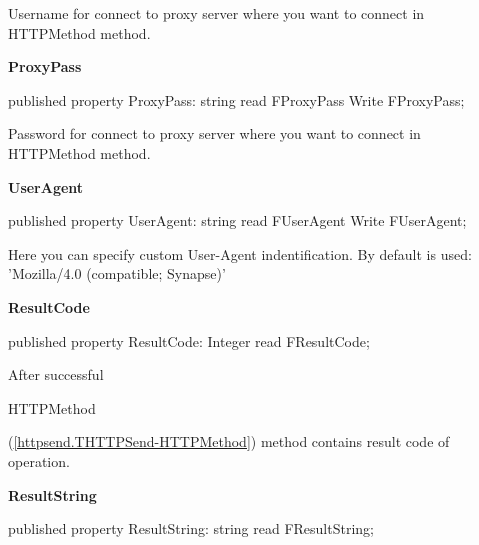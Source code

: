 \documentclass{report}
\newif\ifpdf
\begin{document}
\begin{list}{}
\begin{flushleft}
\ifpdf
\end{flushleft}
\fi


\par Username for connect to proxy server where you want to connect in HTTPMethod method.\label{httpsend.THTTPSend-ProxyPass}
\item[\textbf{ProxyPass}\hfill]
\ifpdf
\begin{flushleft}
\fi
\begin{ttfamily}
published property ProxyPass: string read FProxyPass Write FProxyPass;\end{ttfamily}

\ifpdf
\end{flushleft}
\fi


\par Password for connect to proxy server where you want to connect in HTTPMethod method.\label{httpsend.THTTPSend-UserAgent}
\item[\textbf{UserAgent}\hfill]
\ifpdf
\begin{flushleft}
\fi
\begin{ttfamily}
published property UserAgent: string read FUserAgent Write FUserAgent;\end{ttfamily}

\ifpdf
\end{flushleft}
\fi


\par Here you can specify custom User{-}Agent indentification. By default is used: 'Mozilla/4.0 (compatible; Synapse)'\label{httpsend.THTTPSend-ResultCode}
\item[\textbf{ResultCode}\hfill]
\ifpdf
\begin{flushleft}
\fi
\begin{ttfamily}
published property ResultCode: Integer read FResultCode;\end{ttfamily}

\ifpdf
\end{flushleft}
\fi


\par After successful \begin{ttfamily}HTTPMethod\end{ttfamily}(\ref{httpsend.THTTPSend-HTTPMethod}) method contains result code of operation.\label{httpsend.THTTPSend-ResultString}
\item[\textbf{ResultString}\hfill]
\ifpdf
\begin{flushleft}
\fi
\begin{ttfamily}
published property ResultString: string read FResultString;\end{ttfamily}


\end{flushleft}
\end{list}
\end{document}
